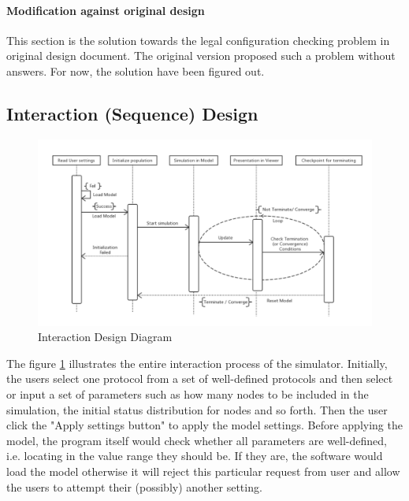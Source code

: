 \paragraph{Modification against original design}
This section is the solution towards the legal configuration checking problem in
original design document. The original version proposed such a problem without answers.
For now, the solution have been figured out.

\subsection{Interaction (Sequence) Design}
\begin{figure}[H]
\begin{center}
\includegraphics[width =\textwidth]{context/diagram/interaction.pdf}
\caption{Interaction Design Diagram}
\label{interactionG}
\end{center}
\end{figure}

\par\noindent
The figure \ref{interactionG} illustrates the entire interaction process of the
simulator. Initially, the users select one protocol from a set of well-defined
protocols and then select or input a set of parameters such as how many nodes to
be included in the simulation, the initial status distribution for nodes and so forth.
Then the user click the "Apply settings button" to apply the model settings. Before
applying the model, the program itself would check whether all parameters are
well-defined, i.e. locating in the value range they should be. If they are, the software
would load the model otherwise it will reject this particular request from user and
allow the users to attempt their (possibly) another setting.

